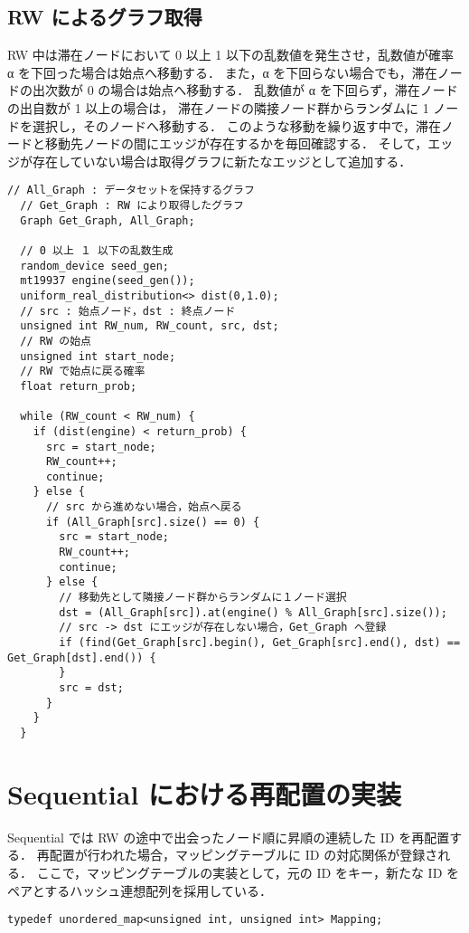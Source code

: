 \subsection{RW によるグラフ取得}
RW 中は滞在ノードにおいて 0 以上 1 以下の乱数値を発生させ，乱数値が確率 α を下回った場合は始点へ移動する．
また，α を下回らない場合でも，滞在ノードの出次数が 0 の場合は始点へ移動する．
乱数値が α を下回らず，滞在ノードの出自数が 1 以上の場合は，
滞在ノードの隣接ノード群からランダムに 1 ノードを選択し，そのノードへ移動する．
このような移動を繰り返す中で，滞在ノードと移動先ノードの間にエッジが存在するかを毎回確認する．
そして，エッジが存在していない場合は取得グラフに新たなエッジとして追加する．
\begin{lstlisting}[caption=RW によるグラフ取得, label=rw_graph_get]
  // All_Graph : データセットを保持するグラフ
  // Get_Graph : RW により取得したグラフ
  Graph Get_Graph, All_Graph;

  // 0 以上 １ 以下の乱数生成 
  random_device seed_gen;
  mt19937 engine(seed_gen());
  uniform_real_distribution<> dist(0,1.0);
  // src : 始点ノード，dst : 終点ノード
  unsigned int RW_num, RW_count, src, dst;
  // RW の始点
  unsigned int start_node;
  // RW で始点に戻る確率
  float return_prob;

  while (RW_count < RW_num) {
    if (dist(engine) < return_prob) {
      src = start_node;
      RW_count++;
      continue;
    } else {
      // src から進めない場合，始点へ戻る
      if (All_Graph[src].size() == 0) {
        src = start_node;
        RW_count++;
        continue;
      } else {
        // 移動先として隣接ノード群からランダムに１ノード選択
        dst = (All_Graph[src]).at(engine() % All_Graph[src].size());
        // src -> dst にエッジが存在しない場合，Get_Graph へ登録
        if (find(Get_Graph[src].begin(), Get_Graph[src].end(), dst) == Get_Graph[dst].end()) {
        }
        src = dst;
      }
    }
  }
\end{lstlisting}
\section{Sequential における再配置の実装}
Sequential では RW の途中で出会ったノード順に昇順の連続した ID を再配置する．
再配置が行われた場合，マッピングテーブルに ID の対応関係が登録される．
ここで，マッピングテーブルの実装として，元の ID をキー，新たな ID をペアとするハッシュ連想配列を採用している．
\begin{lstlisting}[caption=マッピングテーブル, label=mapping_table]
  typedef unordered_map<unsigned int, unsigned int> Mapping;
\end{lstlisting}

